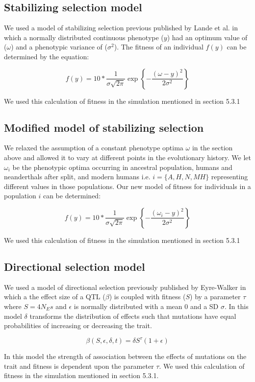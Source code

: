 \subsection{Stabilizing selection model}
We used a model of stabilizing selection previous published by Lande et al.\cite{lande1976natural} in which a normally distributed continuous phenotype ($y$) had an optimum value of ($\omega$) and a phenotypic variance of ($\sigma^2$). The fitness of an individual $f(y)$ can be determined by the equation:

$$f(y) = 10 * \frac{1}{\sigma\sqrt{2\pi}} \exp{\left\{ -\frac{(\omega-y)^2}{2\sigma^2}\right \}}$$

We used this calculation of fitness in the simulation mentioned in section 5.3.1

\subsection{Modified model of stabilizing selection}
We relaxed the assumption of a constant phenotype optima $\omega$ in the section above and allowed it to vary at different points in the evolutionary history. We let $\omega_i$ be the phenotypic optima occurring in ancestral population, humans and neanderthals after split, and modern humans i.e. $i=\{A,H,N,MH\}$ representing different values in those populations. Our new model of fitness for individuals in a population $i$ can be determined: 

$$f(y) = 10 * \frac{1}{\sigma\sqrt{2\pi}} \exp{\left\{ -\frac{(\omega_i-y)^2}{2\sigma^2}\right \}}$$

We used this calculation of fitness in the simulation mentioned in section 5.3.1

\subsection{Directional selection model}
We used a model of directional selection previously published by Eyre-Walker \cite{eyre2010genetic} in which a the effect size of a QTL ($\beta$) is coupled with fitness ($S$) by a parameter $\tau$ where $S = 4N_Es$ and $\epsilon$ is normally distributed with a mean 0 and a SD $\sigma$. In this model $\delta$ transforms the distribution of effects such that mutations have equal probabilities of increasing or decreasing the trait.

$$\beta(S,\epsilon,\delta,t) = \delta S^{\tau}(1+\epsilon)$$

In this model the strength of association between the effects of mutations on the trait and fitness is dependent upon the parameter $\tau$. We used this calculation of fitness in the simulation mentioned in section 5.3.1.

